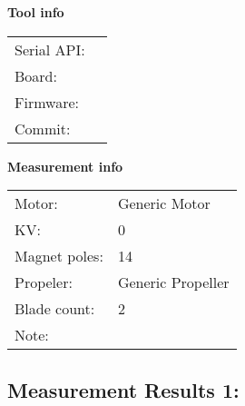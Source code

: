 \documentclass[10pt]{article}
\begin{document}
\noindent
{\large \bf Tool info}
\vspace{3mm}

\noindent
\begin{tabular}{ll}
Serial API:  & \\ 
Board:       & \\ 
Firmware:    & \\ 
Commit:      & 
\end{tabular}
\vspace{3mm}

\noindent
{\large \bf Measurement info}
\vspace{3mm}

\noindent
\begin{tabular}{ll}
Motor:        & Generic Motor\\ 
KV:           & 0\\ 
Magnet poles: & 14\\ 
Propeler:     & Generic Propeller\\ 
Blade count:  & 2\\ 
Note:         & 
\end{tabular}

\vspace{3mm}


\subsection*{\large \bf Measurement Results 1:}
\end{document}
